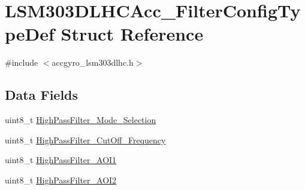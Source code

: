 \hypertarget{structLSM303DLHCAcc__FilterConfigTypeDef}{\section{L\+S\+M303\+D\+L\+H\+C\+Acc\+\_\+\+Filter\+Config\+Type\+Def Struct Reference}
\label{structLSM303DLHCAcc__FilterConfigTypeDef}
}


{\ttfamily \#include $<$accgyro\+\_\+lsm303dlhc.\+h$>$}

\subsection*{Data Fields}
\begin{DoxyCompactItemize}
\item 
uint8\+\_\+t \hyperlink{structLSM303DLHCAcc__FilterConfigTypeDef_ace3a2b09252915f5134c1270beaac97b}{High\+Pass\+Filter\+\_\+\+Mode\+\_\+\+Selection}
\item 
uint8\+\_\+t \hyperlink{structLSM303DLHCAcc__FilterConfigTypeDef_a575e9564896f50d0848653a41b07e0b8}{High\+Pass\+Filter\+\_\+\+Cut\+Off\+\_\+\+Frequency}
\item 
uint8\+\_\+t \hyperlink{structLSM303DLHCAcc__FilterConfigTypeDef_a2c5ef17ea22f8968849e174dfd2df98f}{High\+Pass\+Filter\+\_\+\+A\+O\+I1}
\item 
uint8\+\_\+t \hyperlink{structLSM303DLHCAcc__FilterConfigTypeDef_a14d13f561b59497e82a2667236ca52b1}{High\+Pass\+Filter\+\_\+\+A\+O\+I2}
\end{DoxyCompactItemize}


